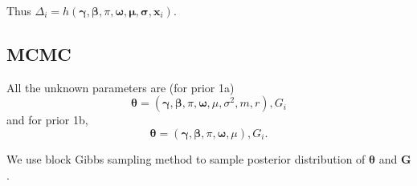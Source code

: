 Thus $\Delta_i = h(\bm \gamma, \bm \beta, \pi , \bm \omega, \bm \mu,\bm \sigma, \bm x_i)$.

\subsection{MCMC}

All the unknown parameters are (for prior 1a)
\begin{displaymath}
  \bm \theta = ( \bm \gamma, \bm \beta,\pi, \bm \omega,  \mu, \sigma^2, m, r), G_i
\end{displaymath}
and for prior 1b,
\begin{displaymath}
  \bm \theta = ( \bm \gamma, \bm \beta,\pi, \bm \omega,  \mu), G_i.
\end{displaymath}

We use block Gibbs sampling method to sample posterior distribution of $\bm \theta$ and $\bm G$.
